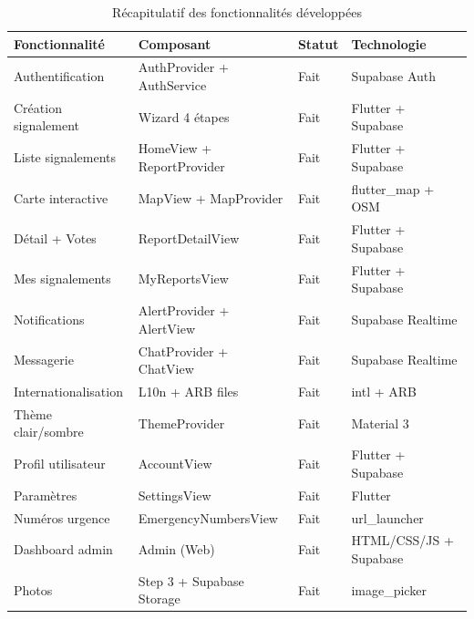 \documentclass[12pt,a4paper]{report}
\newcommand{\done}{\textcolor{okgreen}{\checkmark}}
\begin{document}
{\small
\begin{longtable}{|p{3cm}|p{4cm}|p{2.5cm}|p{4.5cm}|}
    \caption{Récapitulatif des fonctionnalités développées}
    \label{tab:features}\\
    \hline
    \rowcolor{supnumgreen!20}
    \textbf{Fonctionnalité} & \textbf{Composant} & \textbf{Statut} & \textbf{Technologie} \\
    \hline
    \endhead
    \hline
    \endfoot
    Authentification & AuthProvider + AuthService & \done{}  Fait & Supabase Auth \\
    \hline
    Création signalement & Wizard 4 étapes & \done{}  Fait & Flutter + Supabase \\
    \hline
    Liste signalements & HomeView + ReportProvider & \done{}  Fait & Flutter + Supabase \\
    \hline
    Carte interactive & MapView + MapProvider & \done{}  Fait & flutter\_map + OSM \\
    \hline
    Détail + Votes & ReportDetailView & \done{}  Fait & Flutter + Supabase \\
    \hline
    Mes signalements & MyReportsView & \done{}  Fait & Flutter + Supabase \\
    \hline
    Notifications & AlertProvider + AlertView & \done{}  Fait & Supabase Realtime \\
    \hline
    Messagerie & ChatProvider + ChatView & \done{}  Fait & Supabase Realtime \\
    \hline
    Internationalisation & L10n + ARB files & \done{}  Fait & intl + ARB \\
    \hline
    Thème clair/sombre & ThemeProvider & \done{}  Fait & Material 3 \\
    \hline
    Profil utilisateur & AccountView & \done{}  Fait & Flutter + Supabase \\
    \hline
    Paramètres & SettingsView & \done{}  Fait & Flutter \\
    \hline
    Numéros urgence & EmergencyNumbersView & \done{}  Fait & url\_launcher \\
    \hline
    Dashboard admin & Admin (Web) & \done{}  Fait & HTML/CSS/JS + Supabase \\
    \hline
    Photos & Step 3 + Supabase Storage & \done{}  Fait & image\_picker \\
    \hline
\end{longtable}
}

\end{document}
